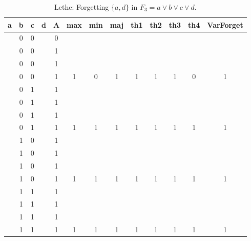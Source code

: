 \begin{table}[!tb]
    \centering
    \begin{tabular}{|c|c|c|c|c|c|c|c|c|c|c|c|c|}
        \hline
        \textbf{a} & \textbf{b} & \textbf{c} & \textbf{d} & \textbf{A} & \textbf{max} & \textbf{min} & \textbf{maj} & \textbf{th1} & \textbf{th2} & \textbf{th3} & \textbf{th4} & \textbf{VarForget} \\ \hline
        \rowcolor{gray!40}  & 0 & 0 &  & 0 &  &  &  &  &  &  &  &  \\ \hline
        \rowcolor{gray!40}  & 0 & 0 &  & 1 &  &  &  &  &  &  &  &  \\ \hline
        \rowcolor{gray!40}  & 0 & 0 &  & 1 &  &  &  &  &  &  &  &  \\ \hline
        \rowcolor{gray!40}  & 0 & 0 &  & 1 & 1 & 0 & 1 & 1 & 1 & 1 & 0 & 1 \\ \hline
        \rowcolor{blue!40}  & 0 & 1 &  & 1 &  &  &  &  &  &  &  &  \\ \hline
        \rowcolor{blue!40}  & 0 & 1 &  & 1 &  &  &  &  &  &  &  &  \\ \hline
        \rowcolor{blue!40}  & 0 & 1 &  & 1 &  &  &  &  &  &  &  &  \\ \hline
        \rowcolor{blue!40}  & 0 & 1 &  & 1 & 1 & 1 & 1 & 1 & 1 & 1 & 1 & 1 \\ \hline
        \rowcolor{red!40}  & 1 & 0 &  & 1 &  &  &  &  &  &  &  &  \\ \hline
        \rowcolor{red!40}  & 1 & 0 &  & 1 &  &  &  &  &  &  &  &  \\ \hline
        \rowcolor{red!40}  & 1 & 0 &  & 1 &  &  &  &  &  &  &  &  \\ \hline
        \rowcolor{red!40}  & 1 & 0 &  & 1 & 1 & 1 & 1 & 1 & 1 & 1 & 1 & 1 \\ \hline
        \rowcolor{green!40}  & 1 & 1 &  & 1 &  &  &  &  &  &  &  &  \\ \hline
        \rowcolor{green!40}  & 1 & 1 &  & 1 &  &  &  &  &  &  &  &  \\ \hline
        \rowcolor{green!40}  & 1 & 1 &  & 1 &  &  &  &  &  &  &  &  \\ \hline
        \rowcolor{green!40}  & 1 & 1 &  & 1 & 1 & 1 & 1 & 1 & 1 & 1 & 1 & 1 \\ \hline
    \end{tabular}
    \caption{Lethe: Forgetting $\{a, d\}$ in $F_{3} = a \lor b \lor c \lor d$.}
    \label{tab:lethe-F3-ad}
\end{table}
